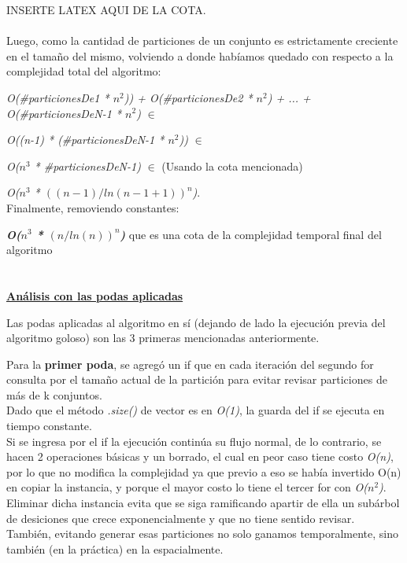 \documentclass[10pt,a4paper]{article}
\begin{document}
INSERTE LATEX AQUI DE LA COTA.\\ \\


\noindent Luego, como la cantidad de particiones de un conjunto es estrictamente creciente en el tamaño del mismo, volviendo a donde habíamos quedado con respecto a la complejidad total del algoritmo:

\noindent \textit{O(\#particionesDe1 * $n^2$)) + O(\#particionesDe2 * $n^2$) + ... + O(\#particionesDeN-1 * $n^2$)} $\in$

\noindent \textit{O((n-1) * (\#particionesDeN-1 * $n^2$))} $\in$ 

\noindent \textit{O($n^3$ * \#particionesDeN-1)} $\in$ (Usando la cota mencionada)

\noindent \textit{O($n^3$ * $((n-1)/ln(n-1+1))^n$)}.\\

Finalmente, removiendo constantes:

\textbf{\textit{O($n^3$ * $(n/ln(n))^n$)}} que es una cota de la complejidad temporal final del algoritmo\\ \\ \\

\underline{\textbf{Análisis con las podas aplicadas}}

Las podas aplicadas al algoritmo en sí (dejando de lado la ejecución previa del algoritmo goloso) son las 3 primeras mencionadas anteriormente.

Para la \textbf{primer poda}, se agregó un if que en cada iteración del segundo for consulta por el tamaño actual de la partición para evitar revisar particiones de más de k conjuntos.\\
Dado que el método \textit{.size()} de vector es en \textit{O(1)}, la guarda del if se ejecuta en tiempo constante.\\
Si se ingresa por el if la ejecución continúa su flujo normal, de lo contrario, se hacen 2 operaciones básicas y un borrado, el cual en peor caso tiene costo \textit{O(n)}, por lo que no modifica la complejidad ya que previo a eso se había invertido O(n) en copiar la instancia, y porque el mayor costo lo tiene el tercer for con \textit{O($n^2$)}.\\
Eliminar dicha instancia evita que se siga ramificando apartir de ella un subárbol de desiciones que crece exponencialmente y que no tiene sentido revisar.\\
También, evitando generar esas particiones no solo ganamos temporalmente, sino también (en la práctica) en la espacialmente.
\end{document}
